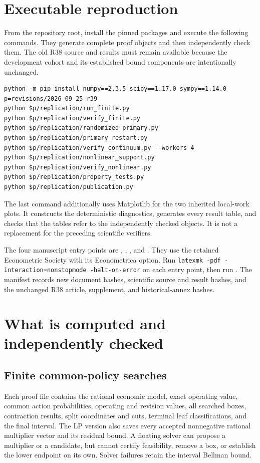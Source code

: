\section{Executable reproduction}
From the repository root, install the pinned packages and execute the following commands. They generate complete proof objects and then independently check them. The old R38 source and results must remain available because the development cohort and its established bound components are intentionally unchanged.
\begin{verbatim}
python -m pip install numpy==2.3.5 scipy==1.17.0 sympy==1.14.0
p=revisions/2026-09-25-r39
python $p/replication/run_finite.py
python $p/replication/verify_finite.py
python $p/replication/randomized_primary.py
python $p/replication/primary_restart.py
python $p/replication/verify_continuum.py --workers 4
python $p/replication/nonlinear_support.py
python $p/replication/verify_nonlinear.py
python $p/replication/property_tests.py
python $p/replication/publication.py
\end{verbatim}
The last command additionally uses Matplotlib for the two inherited local-work plots. It constructs the deterministic diagnostics, generates every result table, and checks that the tables refer to the independently checked objects. It is not a replacement for the preceding scientific verifiers.

The four manuscript entry points are , , , and . They use the retained Econometric Society  with its Econometrica option. Run \texttt{latexmk -pdf -interaction=nonstopmode -halt-on-error} on each entry point, then run . The manifest records new document hashes, scientific source and result hashes, and the unchanged R38 article, supplement, and historical-annex hashes.

\section{What is computed and independently checked}
\subsection{Finite common-policy searches}
Each proof file contains the rational economic model, exact operating value, common action probabilities, operating and revision values, all searched boxes, contraction results, split coordinates and cuts, terminal leaf classifications, and the final interval. The LP version also saves every accepted nonnegative rational multiplier vector and its residual bound. A floating solver can propose a multiplier or a candidate, but cannot certify feasibility, remove a box, or establish the lower endpoint on its own. Solver failures retain the interval Bellman bound.

